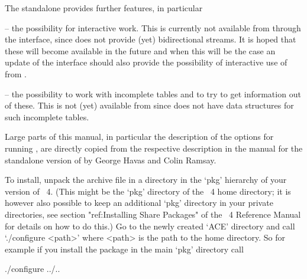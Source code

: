 
The  {\ACE} standalone  provides further  features, in  particular 

\beginlist

\item{--} the possibility for  interactive work. This is currently not
available  from {\GAP} through  the interface,  since {\GAP}  does not
provide  (yet) bidirectional  streams.  It is  hoped  that these  will
become  available in  the future  and when  this will  be the  case an
update  of  the  interface  should  also provide  the  possibility  of
interactive use of {\ACE} from {\GAP}.

\item{--} the possibility to work with incomplete tables and to try to
get information out of these.  This is not (yet) available from {\GAP}
since {\GAP} does not have data structures for such incomplete tables.

\endlist




Large parts of  this manual, in particular      the description of the
options for  running {\ACE}, are  directly copied from  the respective
description in  the manual \cite{HR99a} for the  standalone version of
{\ACE} by George Havas and Colin Ramsay.



To  install, unpack  the  archive file  in  a directory  in the  `pkg'
hierarchy  of your  version  of  {\GAP}~4. (This  might  be the  `pkg'
directory of the {\GAP}~4 home  directory; it is however also possible
to keep an additional `pkg' directory in your private directories, see
section  "ref:Installing  Share Packages"  of  the {\GAP}~4  Reference
Manual for details  on how to do this.) Go to  the newly created `ACE'
directory and  call `./configure <path>'  where <path> is the  path to
the {\GAP} home  directory. So for example if  you install the package
in the main `pkg' directory call

\begintt
./configure ../..
\endtt


